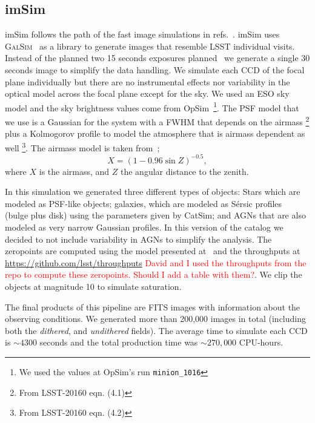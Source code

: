 \documentclass[\docopts]{\docclass}
\begin{document}
\subsection{imSim}
\label{sec:imsim_pipeline}

imSim follows the path of the fast image simulations in refs.~\citep{2016MNRAS.457..786S,2016ApJ...817...25B}.
imSim uses \textsc{GalSim}~\citep{2015A&C....10..121R} as a library to generate images that resemble LSST individual visits. Instead of the
planned two 15 seconds exposures planned~\citep{2008arXiv0805.2366I} we generate a single 30 seconds image to simplify the data handling.
We simulate each CCD of the focal plane individually but there are no instrumental effects nor variability in the optical model
across the focal plane except for the sky. We used an ESO sky model and the sky brightness values come from
OpSim~\citep{2014SPIE.9150E..15D}\footnote{We used the values at OpSim's run \texttt{minion\_1016}}. The PSF model that we use is a Gaussian for the system with a FWHM that depends on the airmass
\footnote{From LSST-20160 eqn. (4.1)} plus a Kolmogorov profile to model the atmosphere that is airmass dependent as well
\footnote{From LSST-20160 eqn. (4.2)}. The airmass model is taken from~\citep{1991PASP..103.1033K};
\begin{equation}
X = (1 - 0.96\sin{Z})^{-0.5},
\end{equation}
where $X$ is the airmass, and $Z$ the angular distance to the zenith.

In this simulation we generated three different types of objects: Stars which are modeled as PSF-like objects; galaxies, which are modeled as S\'{e}rsic profiles~\citep{1963BAAA....6...41S} (bulge plus disk) using
the parameters given by CatSim; and AGNs that are also modeled as very narrow Gaussian profiles. In this version of the catalog we decided
to not include variability in AGNs to simplify the analysis. The zeropoints are computed using the model presented at~\citep{2008arXiv0805.2366I} and the
throughputs at \url{https://github.com/lsst/throughputs} \textcolor{red}{David and I used the throughputs from the repo to compute these zeropoints. Should I add a table with them?}. We clip the objects at magnitude 10 to simulate saturation.

The final products of this pipeline are FITS images with information about the observing conditions. We generated more than 200,000 images in total (including both the \textit{dithered}, and \textit{undithered} fields). The average time to simulate each CCD is $\sim 4300$ seconds and the total production time was $\sim 270,000$ CPU-hours.
\end{document}
